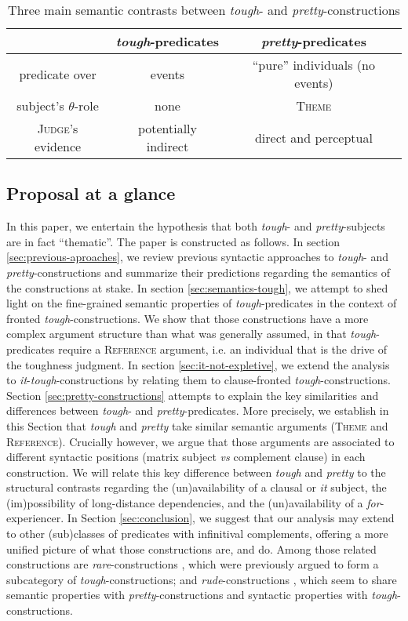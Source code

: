 \documentclass[11pt]{article}
\begin{document}
\begin{table}[H]
	\centering
	\begin{tabular}{|c|c|c|}
		\hline
		& \textit{tough}-predicates & \textit{pretty}-predicates \\ \hline
		predicate over & events & ``pure'' individuals (no events) \\
		subject's $\theta$-role & none & \textsc{Theme} \\
		\textsc{Judge}'s evidence & potentially indirect & direct and perceptual \\ \hline
	\end{tabular}
	\caption{Three main semantic contrasts between \textit{tough}- and \textit{pretty}-constructions}
\end{table}
\subsection{Proposal at a glance}
In this paper, we entertain the hypothesis that both \textit{tough}- and \textit{pretty}-subjects are in fact ``thematic''. The paper is constructed as follows. In section \ref{sec:previous-aproaches}, we review previous syntactic approaches to \textit{tough}- and \textit{pretty}-constructions and summarize their predictions regarding the semantics of the constructions at stake. In section \ref{sec:semantics-tough}, we attempt to shed light on the fine-grained semantic properties of \textit{tough}-predicates in the context of fronted \textit{tough}-constructions. We show that those constructions have a more complex argument structure than what was generally assumed, in that \textit{tough}-predicates require a \textsc{Reference} argument, i.e. an individual that is the drive of the toughness judgment. In section \ref{sec:it-not-expletive}, we extend the analysis to \textit{it}-\textit{tough}-constructions by relating them to clause-fronted \textit{tough}-constructions. Section \ref{sec:pretty-constructions} attempts to explain the key similarities and differences between \textit{tough}- and \textit{pretty}-predicates. More precisely, we establish in this Section that \textit{tough} and \textit{pretty} take similar semantic arguments (\textsc{Theme} and \textsc{Reference}). Crucially however, we argue that those arguments are associated to different syntactic positions (matrix subject \textit{vs} complement clause) in each construction. We will relate this key difference between \textit{tough} and \textit{pretty} to the structural contrasts regarding the (un)availability of a clausal or \textit{it} subject, the (im)possibility of long-distance dependencies, and the (un)availability of a \textit{for}-experiencer. In Section \ref{sec:conclusion}, we  suggest that our analysis may extend to other (sub)classes of predicates with infinitival complements, offering a more unified picture of what those constructions are, and do. Among those related constructions are \textit{rare}-constructions \cite{Fleisher2015}, which were previously argued to form a subcategory of \textit{tough}-constructions; and \textit{rude}-constructions \cite{Stowell1991}, which seem to share semantic properties with \textit{pretty}-constructions and syntactic properties with \textit{tough}-constructions.
\end{document}
